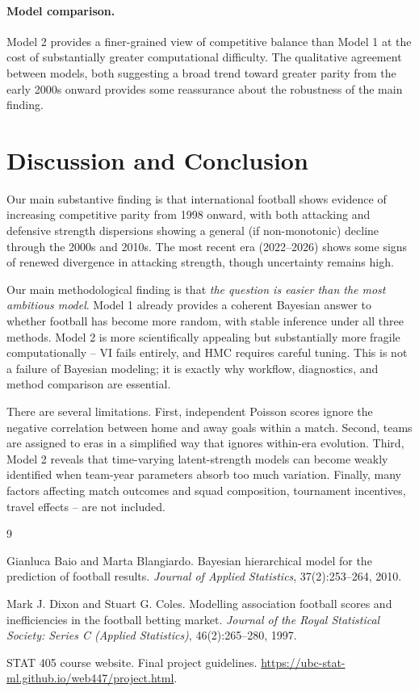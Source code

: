 \documentclass[11pt]{article}
\begin{document}
\paragraph{Model comparison.}
Model 2 provides a finer-grained view of competitive balance than Model 1 at the cost of substantially greater computational difficulty.
The qualitative agreement between models, both suggesting a broad trend toward greater parity from the early 2000s onward  provides some reassurance about the robustness of the main finding.

\section{Discussion and Conclusion}

Our main substantive finding is that international football shows evidence of increasing competitive parity from 1998 onward, with both attacking and defensive strength dispersions showing a general (if non-monotonic) decline through the 2000s and 2010s.
The most recent era (2022--2026) shows some signs of renewed divergence in attacking strength, though uncertainty remains high.

Our main methodological finding is that \emph{the question is easier than the most ambitious model}.
Model 1 already provides a coherent Bayesian answer to whether football has become more random, with stable inference under all three methods.
Model 2 is more scientifically appealing but substantially more fragile computationally -- VI fails entirely, and HMC requires careful tuning.
This is not a failure of Bayesian modeling; it is exactly why workflow, diagnostics, and method comparison are essential.

There are several limitations.
First, independent Poisson scores ignore the negative correlation between home and away goals within a match.
Second, teams are assigned to eras in a simplified way that ignores within-era evolution.
Third, Model 2 reveals that time-varying latent-strength models can become weakly identified when team-year parameters absorb too much variation.
Finally, many factors affecting match outcomes and squad composition, tournament incentives, travel effects -- are not included.


\newpage

\begin{thebibliography}{9}

Gianluca Baio and Marta Blangiardo.
\newblock Bayesian hierarchical model for the prediction of football results.
\newblock \emph{Journal of Applied Statistics}, 37(2):253--264, 2010.

Mark J. Dixon and Stuart G. Coles.
\newblock Modelling association football scores and inefficiencies in the football betting market.
\newblock \emph{Journal of the Royal Statistical Society: Series C (Applied Statistics)}, 46(2):265--280, 1997.

STAT 405 course website.
\newblock Final project guidelines.
\newblock \url{https://ubc-stat-ml.github.io/web447/project.html}.


\end{thebibliography}
\end{document}
